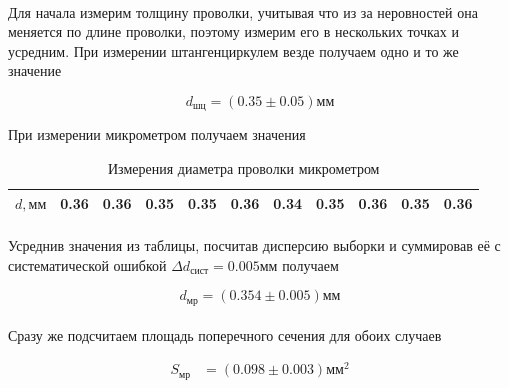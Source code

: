 \documentclass[a4paper,12pt]{article}
\begin{document}
    \paragraph{}
    Для начала измерим толщину проволки, учитывая что из за неровностей она меняется по длине проволки, поэтому измерим его в нескольких точках и усредним.
    При измерении штангенциркулем везде получаем одно и то же значение

    \[d_{шц} = (0.35 \pm 0.05) мм\]

    \vspace{0.5cm}

    \begin{center}
        При измерении микрометром получаем значения
    \end{center}

    \begin{table}[H]
        \begin{center}

         \begin{tabular}{|c|c|c|c|c|c|c|c|c|c|c|}
            \hline
            \multirow{1}{*}{\textbf{$d, мм$}}
            & 0.36 & 0.36 & 0.35 & 0.35 & 0.36 & 0.34 & 0.35 & 0.36 & 0.35 & 0.36\\
            \hline
        \end{tabular}
            \caption{Измерения диаметра проволки микрометром}
        \end{center}

    \end{table}
    \paragraph{}
    Усреднив значения из таблицы, посчитав дисперсию выборки и суммировав её с систематической ошибкой $\Delta d_{сист} = 0.005мм$ получаем

    \[d_{мр} = (0.354 \pm 0.005)мм\]

    \paragraph{}
    Сразу же подсчитаем площадь поперечного сечения для обоих случаев

    \begin{align*}
        S_{мр} &= (0.098 \pm 0.003)мм^2
    \end{align*}

    \newpage
\end{document}
